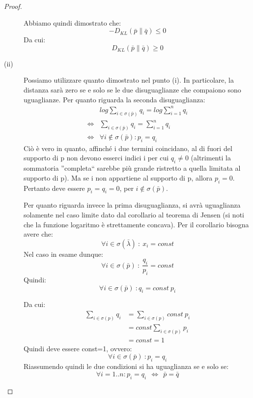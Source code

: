 \begin{teorema}
\begin{proof}
\begin{description}
  Abbiamo quindi dimostrato che:
  \[
   -D_{KL}(\bar{p} \| \bar{q}) \le 0
  \]
  Da cui:
  \[
   D_{KL}(\bar{p} \| \bar{q}) \ge 0
  \]
 \item[(ii)]
  Possiamo utilizzare quanto dimostrato nel punto (i). In particolare, la distanza sarà zero se e solo se 
  le due disuguaglianze che compaiono sono uguaglianze.
  Per quanto riguarda la seconda disuguaglianza:
  \[\begin{split}
   &log \sum_{i \in \sigma(\bar{p})} q_i=log \sum_{i=1}^n q_i \\
   \iff &\sum_{i \in \sigma(\bar{p})} q_i=\sum_{i=1}^n q_i \\
   \iff & \forall i \notin \sigma(\bar{p}) : p_i=q_i
   \end{split}
  \]
   Ciò è vero in quanto, affinché i due termini coincidano, al di fuori del supporto di p non devono esserci indici i per cui 
   $q_i \ne 0$ (altrimenti la sommatoria ''completa`` sarebbe più grande ristretto a quella limitata al supporto di p).
   Ma se i non appartiene al supporto di p, allora $p_i=0$. Pertanto deve essere $p_i=q_i=0$, per $i \notin \sigma(\bar{p})$.

   Per quanto riguarda invece la prima disuguaglianza, si avrà uguaglianza solamente nel caso limite dato dal corollario al teorema 
   di Jensen (si noti che la funzione logaritmo è strettamente concava).
   Per il corollario bisogna avere che:
   \[
    \forall i \in \sigma(\bar{\lambda}) \ : \ x_i=const
   \]
   Nel caso in esame dunque:
   \[
    \forall i \in \sigma(\bar{p}) \ : \ \frac{q_i}{p_i}=const
   \]
   Quindi:
   \[
    \forall i \in \sigma(\bar{p}) \ : q_i=const \ p_i
   \]

   Da cui:
   \[ \begin{split}
    \sum_{i \in \sigma(p)} q_i &=\sum_{i \in \sigma(p)} const \ p_i \\
     &=const \sum_{i \in \sigma(p)} p_i \\
     &=const=1
    \end{split}
   \]
   Quindi deve essere const=1, ovvero:
   \[
    \forall i \in \sigma(\bar{p}) \ : p_i=q_i
   \]
   Riassumendo quindi le due condizioni si ha uguaglianza se e solo se:
   \[
    \forall i=1..n : p_i=q_i \ \ \iff \ \ \bar{p}=\bar{q}
   \]

\end{description}

\end{proof}
\label{leibler}
\end{teorema}

